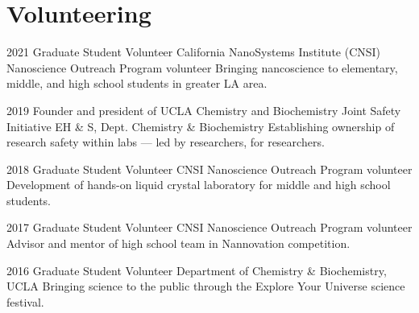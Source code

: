 \section{Volunteering}

\begin{entrylist}
\entry
{2021}
{Graduate Student Volunteer}
{California NanoSystems Institute (CNSI) Nanoscience Outreach Program volunteer}
{Bringing nancoscience to elementary, middle, and high school students in greater LA area.}

\entry
{2019}
{Founder and president of UCLA Chemistry and Biochemistry Joint Safety Initiative}
{EH \& S, Dept. Chemistry \& Biochemistry}
{Establishing ownership of research safety within labs — led by researchers, for researchers.}

\entry
{2018}
{Graduate Student Volunteer}
{CNSI Nanoscience Outreach Program volunteer}
{Development of hands-on liquid crystal laboratory for middle and high school students.}

\entry
{2017}
{Graduate Student Volunteer}
{CNSI Nanoscience Outreach Program volunteer}
{Advisor and mentor of high school team in Nannovation competition.}

\entry
{2016}
{Graduate Student Volunteer}
{Department of Chemistry \& Biochemistry, UCLA}
{Bringing science to the public through the Explore Your Universe science festival.}
\end{entrylist}

